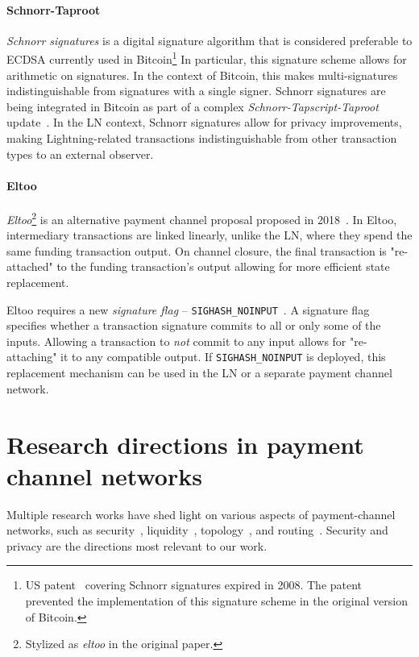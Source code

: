 \paragraph{Schnorr-Taproot}

\textit{Schnorr signatures} is a digital signature algorithm that is considered preferable to ECDSA currently used in Bitcoin\footnote{US patent~\cite{Schnorr1989} covering Schnorr signatures expired in 2008. The patent prevented the implementation of this signature scheme in the original version of Bitcoin.}
In particular, this signature scheme allows for arithmetic on signatures.
In the context of Bitcoin, this makes multi-signatures indistinguishable from signatures with a single signer.
Schnorr signatures are being integrated in Bitcoin as part of a complex \textit{Schnorr-Tapscript-Taproot} update~\cite{Hertig2020}.
In the LN context, Schnorr signatures allow for privacy improvements, making Lightning-related transactions indistinguishable from other transaction types to an external observer.

\paragraph{Eltoo}

\textit{Eltoo}\footnote{Stylized as \textit{eltoo} in the original paper.} is an alternative payment channel proposal proposed in 2018~\cite{Decker2018}.
In Eltoo, intermediary transactions are linked linearly, unlike the LN, where they spend the same funding transaction output.
On channel closure, the final transaction is "re-attached" to the funding transaction's output allowing for more efficient state replacement.

Eltoo requires a new \textit{signature flag} -- \texttt{SIGHASH\_NOINPUT}~\cite{Decker2017}.
A signature flag specifies whether a transaction signature commits to all or only some of the inputs.
Allowing a transaction to \textit{not} commit to any input allows for "re-attaching" it to any compatible output.
If \texttt{SIGHASH\_NOINPUT} is deployed, this replacement mechanism can be used in the LN or a separate payment channel network.


\section{Research directions in payment channel networks}

Multiple research works have shed light on various aspects of payment-channel networks, such as security~\cite{Malavolta2019, Kiayias2019},  liquidity~\cite{Dandekar2011, MorenoSanchez2018, Conoscenti2019}, topology~\cite{Martinazzi2019, Seres2019}, and routing~\cite{Engelmann2017, Prihodko2016, Malavolta2017a, Grunspan2018, Osuntokun2018, Piatkivskyi2018, Roos2018, Sivaraman2018, Bagaria2019, Pickhardt2019, Pickhardt2019a, ZmnSCPxj2019, ZmnSCPxj2019a, ZmnSCPxj2019b}.
Security and privacy are the directions most relevant to our work.

